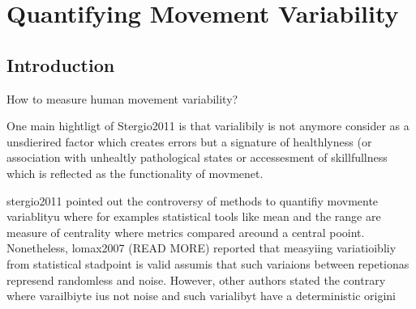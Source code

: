
\chapter{Quantifying Movement Variability}

%



\section{Introduction}


How to measure human movement variability?



One main hightligt of Stergio2011 is that varialibily 
is not anymore consider as a unsdierired factor which creates errors
but a signature of healthlyness (or association with unhealtly pathological states
or accessesment of skillfullness which is reflected as 
the functionality of movmenet.


stergio2011 pointed out the controversy of methods to quantifiy movmente variablityu
where for examples statistical tools like mean and the range are measure of 
centrality where metrics compared areound a central pooint.
Nonetheless, lomax2007 (READ MORE) reported that 
measyiing variatioibliy from statistical stadpoint is valid 
assumis that such variaions between repetionas 
represend randomless and noise.
However, other authors stated the contrary where
varailbiyte ius not noise 
and such varialibyt have a deterministic origini

